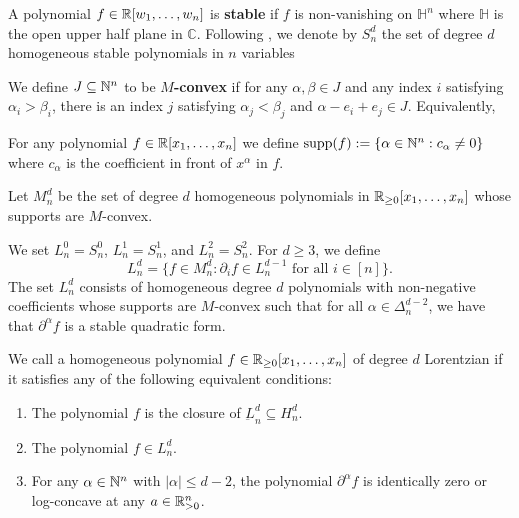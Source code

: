 \documentclass{puthesis-UG}
\begin{document}
\begin{defn}
	A polynomial $f \in \mathbb{R}[w_1, \ldots, w_n]$ is \textbf{stable} if $f$ is non-vanishing on $\mathbb{H}^n$ where $\mathbb{H}$ is the open upper half plane in $\mathbb{C}$. Following \cite{milnor-numbers}, we denote by $S_n^d$ the set of degree $d$ homogeneous stable polynomials in $n$ variables 
\end{defn}

\begin{defn}
	We define $J \subseteq \mathbb{N}^n$ to be \textbf{$M$-convex} if for any $\alpha, \beta \in J$ and any index $i$ satisfying $\alpha_i > \beta_i$, there is an index $j$ satisfying $\alpha_j < \beta_j$ and $\alpha - e_i + e_j \in J$. Equivalently, 
\end{defn}

\begin{defn}
	For any polynomial $f \in \mathbb{R}[x_1, \ldots, x_n]$ we define $\text{supp}(f) := \{\alpha \in \mathbb{N}^n : c_\alpha \neq 0\}$ where $c_\alpha$ is the coefficient in front of $x^\alpha$ in $f$. 
\end{defn}

\begin{defn}
	Let $M_n^d$ be the set of degree $d$ homogeneous polynomials in $\mathbb{R}_{\geq 0}[x_1, \ldots, x_n]$ whose supports are $M$-convex.  
\end{defn}



\begin{defn}
	We set $L_n^0 = S_n^0$, $L_n^1 = S_n^1$, and $L_n^2 = S_n^2$. For $d \geq 3$, we define 
	\[
		L_n^d = \{f \in M_n^d : \partial_i f \in L_n^{d-1} \text{ for all } i \in [n]\}.
	\]
	The set $L_n^d$ consists of homogeneous degree $d$ polynomials with non-negative coefficients whose supports are $M$-convex such that for all $\alpha \in \Delta_n^{d-2}$, we have that $\partial^\alpha f$ is a stable quadratic form. 
\end{defn}

\begin{defn} \label{defn-lorentzian}
	We call a homogeneous polynomial $f \in \mathbb{R}_{\geq 0}[x_1, \ldots, x_n]$ of degree $d$ Lorentzian if it satisfies any of the following equivalent conditions:
	\begin{enumerate}[label = (\roman*)]
		\item The polynomial $f$ is the closure of $\underbar{L}_n^d \subseteq H_n^d$. 

		\item The polynomial $f \in L_n^d$. 

		\item For any $\alpha \in \mathbb{N}^n$ with $|\alpha| \leq d-2$, the polynomial $\partial^\alpha f$ is identically zero or log-concave at any $a \in \mathbb{R}_{>0}^n$. 
	\end{enumerate}
\end{defn}
\end{document}

